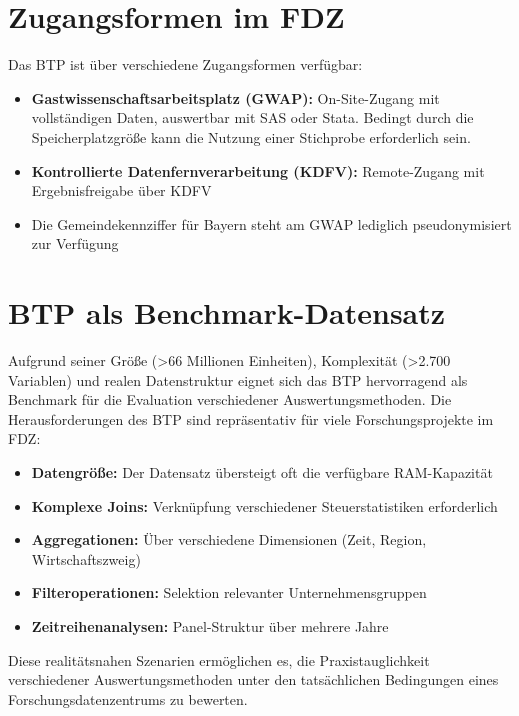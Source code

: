 \documentclass[
  ngerman,
  10pt,
  letterpaper,
  twocolumn]{book}
\providecommand{\tightlist}{%
  \setlength{\itemsep}{0pt}\setlength{\parskip}{0pt}}
\begin{document}
\section{Zugangsformen im FDZ}\label{zugangsformen-im-fdz}

Das BTP ist über verschiedene Zugangsformen verfügbar:

\begin{itemize}
\tightlist
\item
  \textbf{Gastwissenschaftsarbeitsplatz (GWAP):} On-Site-Zugang mit
  vollständigen Daten, auswertbar mit SAS oder Stata. Bedingt durch die
  Speicherplatzgröße kann die Nutzung einer Stichprobe erforderlich
  sein.
\item
  \textbf{Kontrollierte Datenfernverarbeitung (KDFV):} Remote-Zugang mit
  Ergebnisfreigabe über KDFV
\item
  Die Gemeindekennziffer für Bayern steht am GWAP lediglich
  pseudonymisiert zur Verfügung
\end{itemize}

\section{BTP als Benchmark-Datensatz}\label{btp-als-benchmark-datensatz}

Aufgrund seiner Größe (\textgreater66 Millionen Einheiten), Komplexität
(\textgreater2.700 Variablen) und realen Datenstruktur eignet sich das
BTP hervorragend als Benchmark für die Evaluation verschiedener
Auswertungsmethoden. Die Herausforderungen des BTP sind repräsentativ
für viele Forschungsprojekte im FDZ:

\begin{itemize}
\tightlist
\item
  \textbf{Datengröße:} Der Datensatz übersteigt oft die verfügbare
  RAM-Kapazität
\item
  \textbf{Komplexe Joins:} Verknüpfung verschiedener Steuerstatistiken
  erforderlich\\
\item
  \textbf{Aggregationen:} Über verschiedene Dimensionen (Zeit, Region,
  Wirtschaftszweig)
\item
  \textbf{Filteroperationen:} Selektion relevanter Unternehmensgruppen
\item
  \textbf{Zeitreihenanalysen:} Panel-Struktur über mehrere Jahre
\end{itemize}

Diese realitätsnahen Szenarien ermöglichen es, die Praxistauglichkeit
verschiedener Auswertungsmethoden unter den tatsächlichen Bedingungen
eines Forschungsdatenzentrums zu bewerten.
\end{document}
